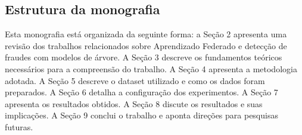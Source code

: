 \subsection{Estrutura da monografia}

Esta monografia está organizada da seguinte forma: a Seção 2 apresenta uma revisão dos trabalhos relacionados sobre Aprendizado Federado e detecção de fraudes com modelos de árvore. A Seção 3 descreve os fundamentos teóricos necessários para a compreensão do trabalho. A Seção 4 apresenta a metodologia adotada. A Seção 5 descreve o dataset utilizado e como os dados foram preparados. A Seção 6 detalha a configuração dos experimentos. A Seção 7 apresenta os resultados obtidos. A Seção 8 discute os resultados e suas implicações. A Seção 9 conclui o trabalho e aponta direções para pesquisas futuras.
